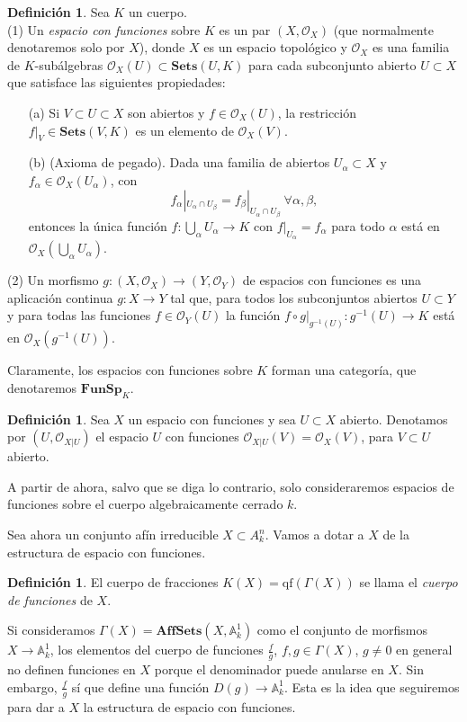 \documentclass[12pt,a4paper]{article}
\theoremstyle{definition} \newtheorem{defn}[thm]{Definición}
\theoremstyle{definition} \newtheorem{ejemplo}[thm]{Ejemplo}
\theoremstyle{definition} \newtheorem{ejercicio}[thm]{Ejercicio}
\theoremstyle{remark} \newtheorem*{obs}{Observación}
\def\AA{\mathbb{A}}
\def\OO{\mathscr{O}}
\begin{document}
      \begin{defn}
	Sea $K$ un cuerpo. \\
	(1) Un \emph{espacio con funciones} sobre $K$ es un par $(X,\OO_X)$ (que normalmente denotaremos solo por $X$), donde $X$ es un espacio topológico y $\OO_X$ es  una familia de $K$-subálgebras $\OO_X(U)\subset \mathbf{Sets}(U,K)$ para cada subconjunto abierto $U\subset X$ que satisface las siguientes propiedades:
	\begin{enumerate}
	  \item[(a)] Si $V\subset U\subset X$ son abiertos y $f\in \OO_X(U)$, la restricción $f|_{V}\in \mathbf{Sets}(V,K)$ es un elemento de $\OO_X(V)$.
	  \item[(b)] (Axioma de pegado). Dada una familia de abiertos $U_{\alpha}\subset X$ y $f_{\alpha}\in \OO_X(U_{\alpha})$, con 
	    \begin{equation*}
	      f_{\alpha}|_{U_{\alpha}\cap U_{\beta}}=f_{\beta}|_{U_{\alpha}\cap U_{\beta}} \ \forall \alpha, \beta,
	    \end{equation*}
	    entonces la única función $f:\bigcup_{\alpha}U_{\alpha}\rightarrow K$ con $f|_{U_{\alpha}}=f_{\alpha}$ para todo $\alpha$ está en $\OO_X(\bigcup_{\alpha}U_{\alpha})$.
	\end{enumerate}
	(2) Un morfismo $g:(X,\OO_X)\rightarrow (Y,\OO_Y)$ de espacios con funciones es una aplicación continua $g:X\rightarrow Y$ tal que, para todos los subconjuntos abiertos $U\subset Y$ y para todas las funciones $f\in \OO_Y(U)$ la función $f\circ g |_{g^{-1}(U)}:g^{-1}(U)\rightarrow K$ está en $\OO_{X}(g^{-1}(U))$.
	
      \end{defn}
      Claramente, los espacios con funciones sobre $K$ forman una categoría, que denotaremos $\mathbf{FunSp}_K$.
      \begin{defn}
	Sea $X$ un espacio con funciones y sea $U\subset X$ abierto. Denotamos por $(U,\OO_{X|U})$ el espacio $U$ con funciones $\OO_{X|U}(V)=\OO_X(V)$, para $V\subset U$ abierto.
      \end{defn}
      A partir de ahora, salvo que se diga lo contrario, solo consideraremos espacios de funciones sobre el cuerpo algebraicamente cerrado $k$.

      Sea ahora un conjunto afín irreducible $X\subset A^n_k$. Vamos a dotar a $X$ de la estructura de espacio con funciones. 
      \begin{defn}
	El cuerpo de fracciones $K(X)=\mathrm{qf}(\Gamma(X))$ se llama el \emph{cuerpo de funciones} de $X$.
      \end{defn}
      Si consideramos $\Gamma(X)=\mathbf{AffSets}(X,\AA^1_k)$ como el conjunto de morfismos $X\rightarrow \AA^1_k$, los elementos del cuerpo de funciones $\frac{f}{g}$, $f,g \in \Gamma(X)$, $g\neq 0$ en general no definen funciones en $X$ porque el denominador puede anularse en $X$. Sin embargo, $\frac{f}{g}$ sí que define una función $D(g)\rightarrow \AA^1_k$. Esta es la idea que seguiremos para dar a $X$ la estructura de espacio con funciones.
\end{document}
